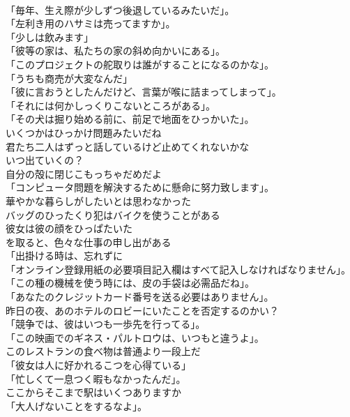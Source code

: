 \documentclass[8pt]{extreport}
\begin{document}
\begin{CJK}{UTF8}{min}
\\	「毎年、生え際が少しずつ後退しているみたいだ」。	
\\	「左利き用のハサミは売ってますか」。	
\\	「少しは飲みます」	
\\	「彼等の家は、私たちの家の斜め向かいにある」。	
\\	「このプロジェクトの舵取りは誰がすることになるのかな」。	
\\	「うちも商売が大変なんだ」	
\\	「彼に言おうとしたんだけど、言葉が喉に詰まってしまって」。	
\\	「それには何かしっくりこないところがある」。	
\\	「その犬は掘り始める前に、前足で地面をひっかいた」。	
\\	いくつかはひっかけ問題みたいだね	
\\	君たち二人はずっと話しているけど止めてくれないかな	
\\	いつ出ていくの？	
\\	自分の殻に閉じこもっちゃだめだよ	
\\	「コンピュータ問題を解決するために懸命に努力致します」。	
\\	華やかな暮らしがしたいとは思わなかった	
\\	バッグのひったくり犯はバイクを使うことがある	
\\	彼女は彼の顔をひっぱたいた	
\\	を取ると、色々な仕事の申し出がある	
\\	「出掛ける時は、忘れずに	
\\	「オンライン登録用紙の必要項目記入欄はすべて記入しなければなりません」。	
\\	「この種の機械を使う時には、皮の手袋は必需品だね」。	
\\	「あなたのクレジットカード番号を送る必要はありません」。	
\\	昨日の夜、あのホテルのロビーにいたことを否定するのかい？	
\\	「競争では、彼はいつも一歩先を行ってる」。	
\\	「この映画でのギネス・パルトロウは、いつもと違うよ」。	
\\	このレストランの食べ物は普通より一段上だ	
\\	「彼女は人に好かれるこつを心得ている」	
\\	「忙しくて一息つく暇もなかったんだ」。	
\\	ここからそこまで駅はいくつありますか	
\\	「大人げないことをするなよ」。	

\end{CJK}
\end{document}

